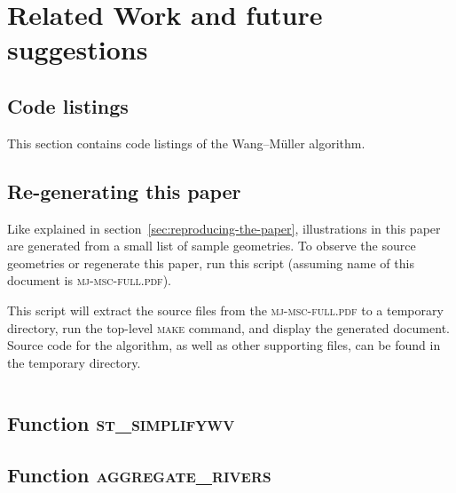 \documentclass[a4paper]{article}
\newcommand{\WM}{Wang--M{\"u}ller}
\newcommand{\inputcode}[2]{\inputminted[fontsize=\small]{#1}{#2}}
\begin{document}

\section{Related Work and future suggestions}
\label{sec:related_work}


\printbibliography

\begin{appendices}

\section{Code listings}

This section contains code listings of the {\WM} algorithm.

\subsection{Re-generating this paper}
\label{sec:code-regenerate}

Like explained in section~\ref{sec:reproducing-the-paper}, illustrations in
    this paper are generated from a small list of sample geometries. To observe
    the source geometries or regenerate this paper, run this script (assuming
    name of this document is \textsc{mj-msc-full.pdf}).

This script will extract the source files from the \textsc{mj-msc-full.pdf} to
    a temporary directory, run the top-level \textsc{make} command, and display
    the generated document. Source code for the algorithm, as well as other
    supporting files, can be found in the temporary directory.

\inputcode{bash}{extract-and-generate}

\subsection{Function \textsc{st\_simplifywv}}

\subsection{Function \textsc{aggregate\_rivers}}

\end{appendices}
\end{document}

